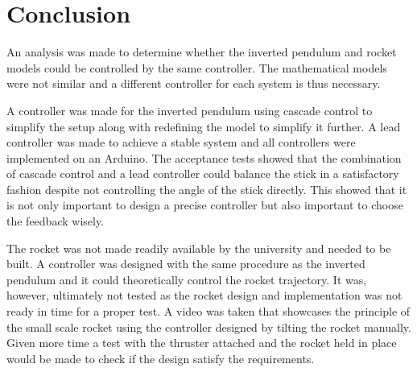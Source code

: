 \chapter{Conclusion}
An analysis was made to determine whether the inverted pendulum and rocket models could be controlled by the same controller. The mathematical models were not similar and a different controller for each system is thus necessary. 

A controller was made for the inverted pendulum using cascade control to simplify the setup along with redefining the model to simplify it further. A lead controller was made to achieve a stable system and all controllers were implemented on an Arduino. The acceptance tests showed that the combination of cascade control and a lead controller could balance the stick in a satisfactory fashion despite not controlling the angle of the stick directly. This showed that it is not only important to design a precise controller but also important to choose the feedback wisely.

The rocket was not made readily available by the university and needed to be built. A controller was designed with the same procedure as the inverted pendulum and it could theoretically control the rocket trajectory. It was, however, ultimately not tested as the rocket design and implementation was not ready in time for a proper test. A video was taken that showcases the principle of the small scale rocket using the controller designed by tilting the rocket manually. Given more time a test with the thruster attached and the rocket held in place would be made to check if the design satisfy the requirements.